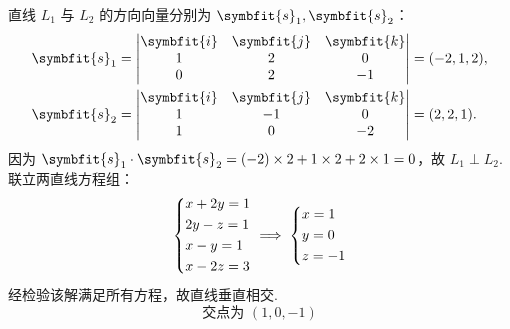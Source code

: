 \begin{solution}

    直线 $L_1$ 与 $L_2$ 的方向向量分别为 $\symbfit{s}_1, \symbfit{s}_2$：
    \begin{equation}
        \begin{aligned}
            \symbfit{s}_1 & = \begin{vmatrix} \symbfit{i} & \symbfit{j} & \symbfit{k} \\ 1 & 2 & 0 \\ 0 & 2 & -1 \end{vmatrix} = (-2, 1, 2), \\
            \symbfit{s}_2 & = \begin{vmatrix} \symbfit{i} & \symbfit{j} & \symbfit{k} \\ 1 & -1 & 0 \\ 1 & 0 & -2 \end{vmatrix} = (2, 2, 1).
        \end{aligned}
    \end{equation}
    因为 $\symbfit{s}_1 \cdot \symbfit{s}_2 = (-2) \times 2 + 1 \times 2 + 2 \times 1 = 0$，故 $L_1 \perp L_2$.
    联立两直线方程组：
    \begin{equation}
        \begin{dcases} x + 2y = 1 \\ 2y - z = 1 \\ x - y = 1 \\ x - 2z = 3 \end{dcases} \implies \begin{dcases} x = 1 \\ y = 0 \\ z = -1 \end{dcases}
    \end{equation}
    经检验该解满足所有方程，故直线垂直相交.
    \begin{equation}
        \boxed{ \text{交点为 } (1, 0, -1) }
    \end{equation}



\end{solution}
